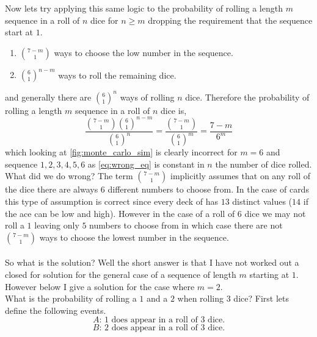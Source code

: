 \documentclass[12pt,a4paper]{article}
\begin{document}
Now lets try applying this same logic to the probability of rolling a length $m$ sequence in a roll of $n$ dice for $n\geq m$ dropping the requirement that the sequence start at $1$.
\begin{enumerate}
\item $\binom{7-m}{1}$ ways to choose the low number in the sequence.
\item $\binom{6}{1}^{n-m}$ ways to roll the remaining dice.
\end{enumerate}
and generally there are $\binom{6}{1}^n$ ways of rolling $n$ dice. Therefore the probability of rolling a length $m$ sequence in a roll of $n$ dice is,
\begin{equation}
\frac{\binom{7-m}{1}\binom{6}{1}^{n-m}}{\binom{6}{1}^n} = \frac{\binom{7-m}{1}}{\binom{6}{1}^m} = \frac{7-m}{6^m}
\label{eq:wrong_eq}
\end{equation}
which looking at \cref{fig:monte_carlo_sim} is clearly incorrect for $m=6$ and sequence $1,2,3,4,5,6$ as \cref{eq:wrong_eq} is constant in $n$ the number of dice rolled.\\

What did we do wrong? The term $\binom{7-m}{1}$ implicitly assumes that on any roll of the dice there are always $6$ different numbers to choose from. In the case of cards this type of assumption is correct 
since every deck of has $13$ distinct values ($14$ if the ace can be low and high). However in the case of a roll of $6$ dice we may not roll a $1$ leaving only $5$ numbers to choose from in which case there
are not $\binom{7-m}{1}$ ways to choose the lowest number in the sequence.\\

\hrulefill\\

So what is the solution? Well the short answer is that I have not worked out a closed for solution for the general case of a sequence of length $m$ starting at $1$. However below I give a solution
for the case where $m=2$.\\

What is the probability of rolling a $1$ and a $2$ when rolling $3$ dice? First lets define the following events.
\begin{equation}
A \text{: 1 does appear in a roll of 3 dice.}
\end{equation}
\begin{equation}
B \text{: 2 does appear in a roll of 3 dice.}
\end{equation}
\end{document}
